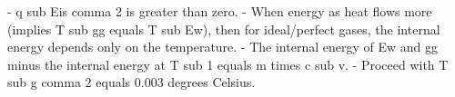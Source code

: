 - q sub Eis comma 2 is greater than zero.
- When energy as heat flows more (implies T sub gg equals T sub Ew), then for ideal/perfect gases, the internal energy depends only on the temperature.
- The internal energy of Ew and gg minus the internal energy at T sub 1 equals m times c sub v.
- Proceed with T sub g comma 2 equals 0.003 degrees Celsius.